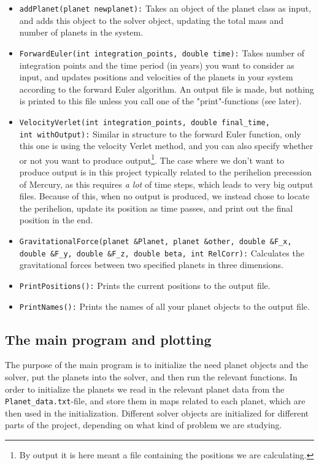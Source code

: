 \documentclass[12pt, a4paper]{article}
\begin{document}
\begin{itemize}
\item \texttt{addPlanet(planet newplanet):} Takes an object of the planet class as input, and adds this 
object to the solver object, updating the total mass and number of planets in the system. 
\item \texttt{ForwardEuler(int integration\_points, double time):} Takes number of integration points 
and the time period (in years) you want to consider as input, and updates positions and velocities of 
the planets in your system according to the forward Euler algorithm. An output file is made, but 
nothing is printed to this file unless you call one of the "print"-functions (see later). 
\item \texttt{VelocityVerlet(int integration\_points, double final\_time, \\ int withOutput):} Similar 
in structure to the forward Euler function, only this one is using the velocity Verlet method, and you can 
also specify whether or not you want to produce output\footnote{By output it is here meant a file 
containing the positions we are calculating.}. The case where we don't want to produce output is in this 
project typically related to the perihelion precession of Mercury, as this requires \textit{a lot} of 
time steps, which leads to very big output files. Because of this, when no output is produced, we 
instead chose to locate the perihelion, update its position as time passes, and print out the final 
position in the end.    
\item \texttt{GravitationalForce(planet \&Planet, planet \&other, double \&F\_x, \\ double \&F\_y, 
double \&F\_z, double beta, int RelCorr):} Calculates the gravitational forces between two specified 
planets in three dimensions.  
\item \texttt{PrintPositions():} Prints the current positions to the output file.    
\item \texttt{PrintNames():} Prints the names of all your planet objects to the output file. 
\end{itemize} 

\subsection{The main program and plotting}

The purpose of the main program is to initialize the need planet objects and the solver, put the planets 
into the solver, and then run the relevant functions. In order to initialize the planets we read 
in the relevant planet data from the \texttt{Planet\_data.txt}-file, and store them in maps related to 
each planet, which are then used in the initialization. Different solver objects are initialized for 
different parts of the project, depending on what kind of problem we are studying.  
\end{document}
